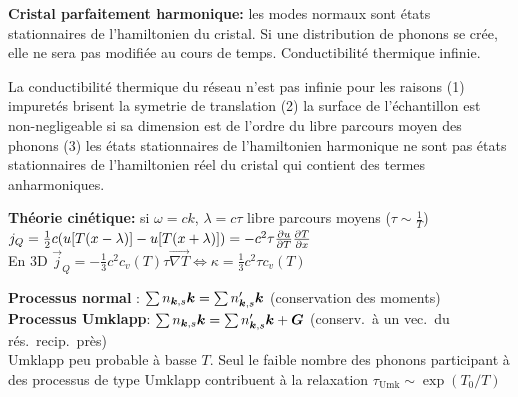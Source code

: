 \begin{squishlist}
    \item \textbf{Cristal parfaitement harmonique:} les modes normaux sont états stationnaires de l'hamiltonien du cristal. Si une distribution de phonons se crée, elle ne sera pas modifiée au cours de temps. Conductibilité thermique infinie.
    \item La conductibilité thermique du réseau n'est pas infinie pour les raisons
    (1) impuretés brisent la symetrie de translation (2) la surface de l'échantillon est non-negligeable si sa dimension est de l'ordre du libre parcours moyen des phonons (3) les états stationnaires de l’hamiltonien harmonique ne sont pas états stationnaires de l’hamiltonien réel du cristal qui contient des termes anharmoniques.
    \item \textbf{Théorie cinétique:} si $\omega = ck$, $\lambda = c \tau$ libre parcours moyens ($\tau \sim \frac{1}{T}$) \\ $j_Q = \frac{1}{2}c (u[T(x-\lambda)] - u[T(x+\lambda)]) = - c^2 \tau \D{T}{u}\D{x}{T}$ \\
    En 3D $\vec{j}_Q = - \frac{1}{3}c^2 c_v(T) \tau \vec{\nabla T} \Longleftrightarrow \kappa = \frac{1}{3} c^2 \tau c_v(T)$
    \item \textbf{Processus normal} : $\sum n_{\vk,s}\vk = \sum n'_{\vk, s}\vk$ (conservation des moments) \\
    \textbf{Processus Umklapp}:  $\sum n_{\vk,s}\vk = \sum n'_{\vk, s}\vk + \vG$ (conserv.\ à un vec.\ du rés.\ recip.\ près) \\
    Umklapp peu probable à basse $T$. Seul le faible nombre des phonons participant à des processus de type Umklapp contribuent à la relaxation $\tau_{\text{Umk}} \sim \exp(T_0/T)$
\end{squishlist}

